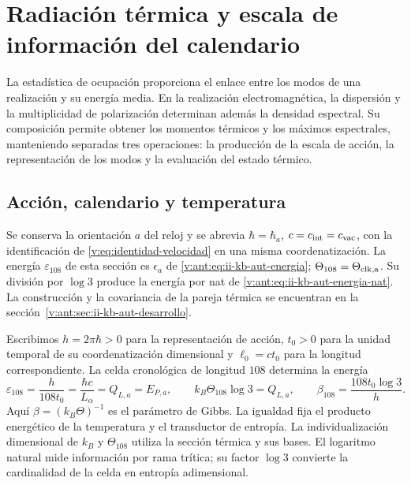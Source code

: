 \section{Radiación térmica y escala de información del calendario}
\label{v:sec:radiacion-termica}

La estadística de ocupación proporciona el enlace entre los modos de
una realización y su energía media. En la realización electromagnética,
la dispersión y la multiplicidad de polarización determinan además la
densidad espectral. Su composición permite obtener los momentos térmicos
y los máximos espectrales, manteniendo separadas tres operaciones:
la producción de la escala de acción, la representación de los modos y
la evaluación del estado térmico.

\subsection{Acción, calendario y temperatura}

Se conserva la orientación \(a\) del reloj y se abrevia
\(\hbar=\hbar_a\), \(c=c_{\rm int}=c_{\rm vac}\), con la
identificación de \eqref{v:eq:identidad-velocidad} en una misma coordenatización.
La energía \(\varepsilon_{108}\) de esta sección es
\(\epsilon_a\) de \eqref{v:ant:eq:ii-kb-aut-energia};
\(\Theta_{108}=\Theta_{\rm clk,a}\). Su división por \(\log3\)
produce la energía por nat de \eqref{v:ant:eq:ii-kb-aut-energia-nat}.
La construcción y la covariancia de la pareja térmica se encuentran en
la sección~\ref{v:ant:sec:ii-kb-aut-desarrollo}.

Escribimos \(h=2\pi\hbar>0\) para la representación de acción, \(t_0>0\)
para la unidad temporal de su coordenatización dimensional y \(\ell_0=ct_0\) para
la longitud correspondiente. La celda cronológica de longitud \(108\)
determina la energía
\begin{equation}
 \varepsilon_{108}=\frac{h}{108t_0}
 =\frac{\hbar c}{L_\alpha}=Q_{L,a}=E_{P,a},\qquad
 k_B\Theta_{108}\log 3=Q_{L,a},\qquad
 \beta_{108}=\frac{108t_0\log3}{h}.
 \label{v:eq:energia-informacion-calendario}
\end{equation}
Aquí \(\beta=(k_B\Theta)^{-1}\) es el parámetro de Gibbs. La igualdad
fija el producto energético de la temperatura y el transductor de
entropía. La individualización dimensional de \(k_B\) y
\(\Theta_{108}\) utiliza la sección térmica y sus bases. El logaritmo
natural mide información por rama trítica; su factor \(\log3\) convierte
la cardinalidad de la celda en entropía adimensional.


